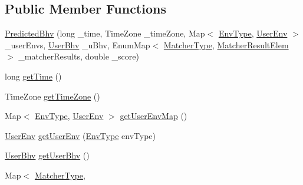 \subsection*{\-Public \-Member \-Functions}
\begin{DoxyCompactItemize}
\item 
\hyperlink{classlab_1_1davidahn_1_1appshuttle_1_1predict_1_1_predicted_bhv_a8ff75b0edd714cbf212901bfa5e1b502}{\-Predicted\-Bhv} (long \-\_\-time, \-Time\-Zone \-\_\-time\-Zone, \-Map$<$ \hyperlink{enumlab_1_1davidahn_1_1appshuttle_1_1collect_1_1env_1_1_env_type}{\-Env\-Type}, \hyperlink{classlab_1_1davidahn_1_1appshuttle_1_1collect_1_1env_1_1_user_env}{\-User\-Env} $>$ \-\_\-user\-Envs, \hyperlink{interfacelab_1_1davidahn_1_1appshuttle_1_1collect_1_1bhv_1_1_user_bhv}{\-User\-Bhv} \-\_\-u\-Bhv, \-Enum\-Map$<$ \hyperlink{enumlab_1_1davidahn_1_1appshuttle_1_1predict_1_1matcher_1_1_matcher_type}{\-Matcher\-Type}, \hyperlink{classlab_1_1davidahn_1_1appshuttle_1_1predict_1_1matcher_1_1_matcher_result_elem}{\-Matcher\-Result\-Elem} $>$ \-\_\-matcher\-Results, double \-\_\-score)
\item 
long \hyperlink{classlab_1_1davidahn_1_1appshuttle_1_1predict_1_1_predicted_bhv_aa0a6c0d62a339a9f1f3be191e5767c2b}{get\-Time} ()
\item 
\-Time\-Zone \hyperlink{classlab_1_1davidahn_1_1appshuttle_1_1predict_1_1_predicted_bhv_a8cc99e2c00be6d697396d7555a5fadda}{get\-Time\-Zone} ()
\item 
\-Map$<$ \hyperlink{enumlab_1_1davidahn_1_1appshuttle_1_1collect_1_1env_1_1_env_type}{\-Env\-Type}, \hyperlink{classlab_1_1davidahn_1_1appshuttle_1_1collect_1_1env_1_1_user_env}{\-User\-Env} $>$ \hyperlink{classlab_1_1davidahn_1_1appshuttle_1_1predict_1_1_predicted_bhv_a09f161b49dede0772c30eecd768a19d8}{get\-User\-Env\-Map} ()
\item 
\hyperlink{classlab_1_1davidahn_1_1appshuttle_1_1collect_1_1env_1_1_user_env}{\-User\-Env} \hyperlink{classlab_1_1davidahn_1_1appshuttle_1_1predict_1_1_predicted_bhv_a888dfce0835ec6ec5a020ebed6117566}{get\-User\-Env} (\hyperlink{enumlab_1_1davidahn_1_1appshuttle_1_1collect_1_1env_1_1_env_type}{\-Env\-Type} env\-Type)
\item 
\hyperlink{interfacelab_1_1davidahn_1_1appshuttle_1_1collect_1_1bhv_1_1_user_bhv}{\-User\-Bhv} \hyperlink{classlab_1_1davidahn_1_1appshuttle_1_1predict_1_1_predicted_bhv_a1a8efd7c7098361205a54f237f245fcd}{get\-User\-Bhv} ()
\item 
\-Map$<$ \hyperlink{enumlab_1_1davidahn_1_1appshuttle_1_1predict_1_1matcher_1_1_matcher_type}{\-Matcher\-Type}, \*

\end{DoxyCompactItemize}
